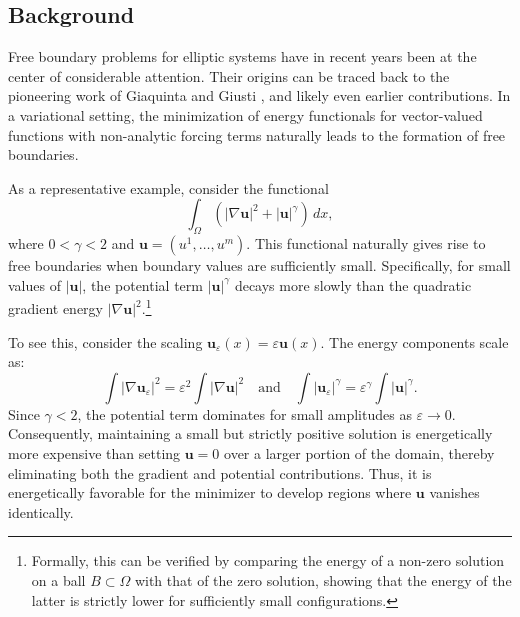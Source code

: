 \documentclass[11pt,oneside,english]{amsart}
\numberwithin{equation}{section}
\theoremstyle{plain}
\numberwithin{equation}{section}
\begin{document}
\subsection{Background}

Free boundary problems for elliptic systems have in recent years been at the center of considerable attention. 
Their origins can be traced back to the pioneering work of Giaquinta and Giusti \cite{GiaGiu83, GiaGiu84}, 
and likely even earlier contributions. 
In a variational setting, the minimization of energy functionals for vector-valued functions with non-analytic forcing terms naturally leads to the formation of free boundaries.

As a representative example, consider the functional
\[
 \int_\Omega (|\nabla \mathbf{u}|^2 + |\mathbf{u}|^\gamma) \, dx,
\]
where $0 < \gamma < 2$ and $\mathbf{u} = (u^1, \dots, u^m)$. This functional naturally gives rise to free boundaries when boundary values are sufficiently small. Specifically, for small values of $|\mathbf{u}|$, the potential term $|\mathbf{u}|^\gamma$ decays more slowly than the quadratic gradient energy $|\nabla \mathbf{u}|^2$.\footnote{Formally, this can be verified by comparing the energy of a non-zero solution on a ball $B \subset \Omega$ with that of the zero solution, showing that the energy of the latter is strictly lower for sufficiently small configurations.}

To see this, consider the scaling $\mathbf{u}_\varepsilon(x) = \varepsilon \mathbf{u}(x)$. The energy components scale as:
\[
\int |\nabla \mathbf{u}_\varepsilon|^2 = \varepsilon^2 \int |\nabla \mathbf{u}|^2 \quad \text{and} \quad \int |\mathbf{u}_\varepsilon|^\gamma = \varepsilon^\gamma \int |\mathbf{u}|^\gamma.
\]
Since $\gamma < 2$, the potential term dominates for small amplitudes as $\varepsilon \to 0$. Consequently, maintaining a small but strictly positive solution is energetically more expensive than setting $\mathbf{u} = 0$ over a larger portion of the domain, thereby eliminating both the gradient and potential contributions. Thus, it is energetically favorable for the minimizer to develop regions where $\mathbf{u}$ vanishes identically.
\end{document}
